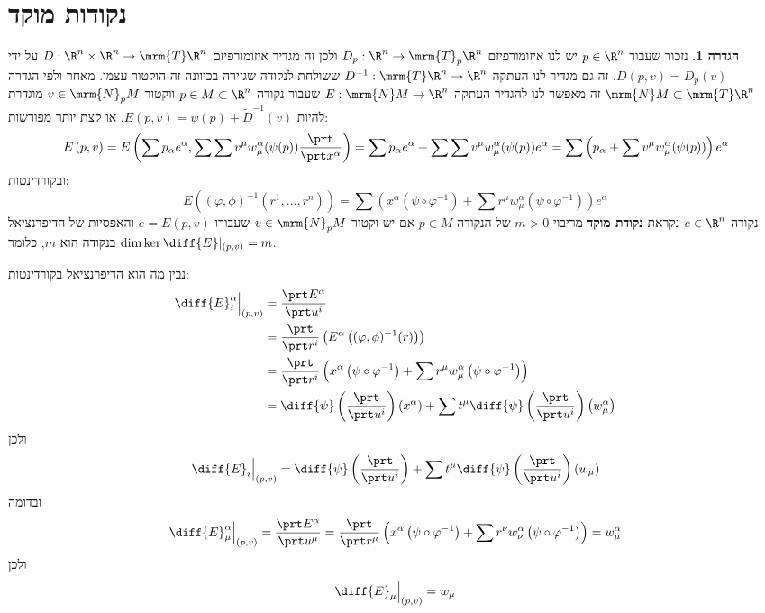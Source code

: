 \documentclass{article}
\theoremstyle{definition}
\newtheorem*{definition*}{הגדרה}
\begin{document}
	\section{נקודות מוקד}

	\begin{definition*}
		נזכור שעבור
		\(p\in\R^n\)
		יש לנו איזומורפיזם
		\(D_p: \R^n \to \mrm{T}_p \R^n\)
		ולכן זה מגדיר איזומורפיזם
		\(D: \R^n \times \R^n \to \mrm{T} \R^n\)
		על ידי
		\(D(p,v)=D_p(v)\).
		זה גם מגדיר לנו העתקה
		\(\tilde{D}^{-1}: \mrm{T} \R^n \to \R^n\)
		ששולחת לנקודה שגזירה בכיוונה זה הוקטור עצמו.
		מאחר ולפי הגדרה
		\(\mrm{N} M \subset \mrm{T} \R^n\)
		זה מאפשר לנו להגדיר העתקה
		\(E:\mrm{N} M \to \R^n\)
		שעבור נקודה
		\(p \in M \subset \R^n\)
		ווקטור
		\(v \in \mrm{N}_p M\)
		מוגדרת להיות
		\(E(p,v)=\psi(p)+\tilde{D}^{-1}(v)\),
		או קצת יותר מפורשות:
		\[
			E\left(p,v\right)
			=E\left(\sum p_\alpha e^\alpha,\sum \sum v^\mu w_\mu^\alpha(\psi(p)) \frac{\prt}{\prt x^\alpha}\right)
			=\sum p_\alpha e^\alpha + \sum\sum v^\mu w_\mu^\alpha(\psi(p)) e^\alpha
			=\sum \left(p_\alpha + \sum v^\mu w_\mu^\alpha(\psi(p))\right) e^\alpha
		\]
		ובקורדינטות:
		\[
			E\left(\left(\varphi,\phi\right)^{-1}\left(r^1,\dotsc,r^n\right)\right)
			=\sum \left(
				x^\alpha\left(\psi\circ\varphi^{-1}\right)
				+\sum r^\mu w_\mu^\alpha\left(\psi\circ\varphi^{-1}\right)
			\right) e^\alpha
		\]
		נקודה
		\(e \in \R^n\)
		נקראת \textbf{נקודת מוקד} מריבוי
		\(m>0\)
		של הנקודה
		\(p \in M\)
		אם יש וקטור
		\(v \in \mrm{N}_p M\)
		שעבורו
		\(e = E(p,v)\)
		והאפסיות של הדיפרנציאל בנקודה הוא \(m\), כלומר
		\(\dim \ker \diff{E}|_{(p,v)} = m\).
	\end{definition*}

	נבין מה הוא הדיפרנציאל בקורדינטות:
	\begin{equation*}\begin{split}
		\diff{E}^\alpha_i\Big|_{\left(p,v\right)}
		&= \frac{\prt E^\alpha}{\prt u^i}
		\\&= \frac{\prt}{\prt r^i}\left (E^\alpha\left((\varphi,\phi)^{-1}(r)\right)\right)
		\\&= \frac{\prt}{\prt r^i} \left(x^\alpha\left(\psi\circ\varphi^{-1}\right)
		+\sum r^\mu w_\mu^\alpha\left(\psi\circ\varphi^{-1}\right)\right)
		\\&= \diff{\psi}\left(\frac{\prt}{\prt u^i}\right)(x^\alpha) + \sum t^\mu \diff{\psi}\left(\frac{\prt}{\prt u^i}\right) \left(w_\mu^\alpha\right)
	\end{split}\end{equation*}
	ולכן
	\[
		\diff{E}_i\Big|_{\left(p,v\right)} = \diff{\psi}\left(\frac{\prt}{\prt u^i}\right) + \sum t^\mu \diff{\psi}\left(\frac{\prt}{\prt u^i}\right) \left(w_\mu\right)
	\]
	ובדומה
	\begin{equation*}
		\diff{E}^\alpha_\mu\Big|_{\left(p,v\right)}
		= \frac{\prt E^\alpha}{\prt u^\mu}
		= \frac{\prt}{\prt r^\mu} \left(x^\alpha\left(\psi\circ\varphi^{-1}\right)
		+\sum r^\nu w_\nu^\alpha\left(\psi\circ\varphi^{-1}\right)\right)
		= w_\mu^\alpha
	\end{equation*}
	ולכן
	\[
		\diff{E}_\mu\Big|_{\left(p,v\right)} = w_\mu
	\]
\end{document}
